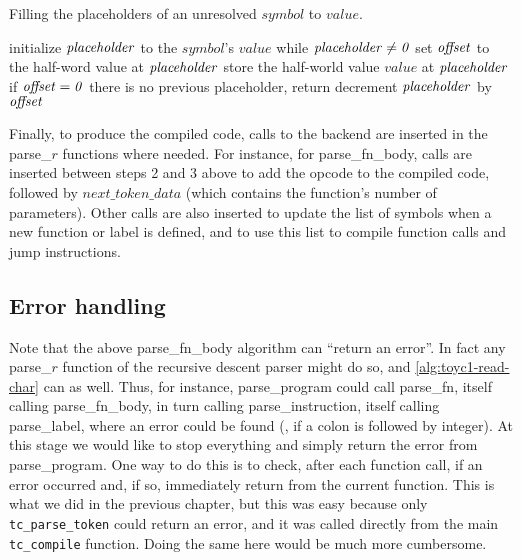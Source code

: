 \begin{Algorithm}
\caption{Filling the placeholders of an unresolved $symbol$ to
  $value$.}\label{alg:toyc1-resolve-refs}
\begin{algorithmic}[1]
\State initialize $\it{placeholder}$ to the $symbol$'s $value$
\Begin while $\it{placeholder} \ne 0$
  \State set $\it{offset}$ to the half-word value at $\it{placeholder}$
  \State store the half-world value $value$ at $\it{placeholder}$
  \State if $\it{offset}=0$ there is no previous placeholder, return
  \State decrement $\it{placeholder}$ by $\it{offset}$
\End
\end{algorithmic}
\end{Algorithm}

Finally, to produce the compiled code, calls to the backend are inserted in the
parse\_$r$ functions where needed. For instance, for parse\_fn\_body, calls are
inserted between steps 2 and 3 above to add the  opcode to the
compiled code, followed by $next\_token\_data$ (which contains the function's
number of parameters). Other calls are also inserted to update the list of
symbols when a new function or label is defined, and to use this list to
compile function calls and jump instructions.

\subsection{Error handling}\label{subsection:toyc1-panic}

Note that the above parse\_fn\_body algorithm can ``return an error''. In
fact any parse\_$r$ function of the recursive descent parser might do so,
and \cref{alg:toyc1-read-char} can as well. Thus, for instance,
parse\_program could call parse\_fn, itself calling parse\_fn\_body, in turn
calling parse\_instruction, itself calling parse\_label, where an error could
be found (\eg, if a colon is followed by
integer). At this stage we would like to stop everything and simply return the
error from parse\_program. One way to do this is to check, after each
function call, if an error occurred and, if so, immediately return from the
current function. This is what we did in the previous chapter, but this was
easy because only {\tt tc\_parse\_token} could return an error,
and it was called directly from the main {\tt tc\_compile} function. Doing the
same here would be much more cumbersome.

